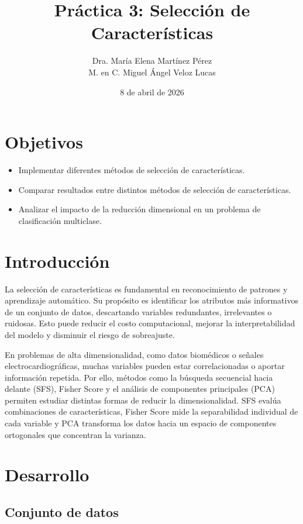 \documentclass{article}
\title{Práctica 3: Selección de Características}
\author{Dra. María Elena Martínez Pérez \\
M. en C. Miguel Ángel Veloz Lucas}
\date{8 de abril de 2026}
\begin{document}
\maketitle

\section{Objetivos}
\begin{itemize}
    \item Implementar diferentes métodos de selección de características.
    \item Comparar resultados entre distintos métodos de selección de características.
    \item Analizar el impacto de la reducción dimensional en un problema de clasificación multiclase.
\end{itemize}

\section{Introducción}

La selección de características es fundamental en reconocimiento de patrones y aprendizaje automático. Su propósito es identificar los atributos más informativos de un conjunto de datos, descartando variables redundantes, irrelevantes o ruidosas. Esto puede reducir el costo computacional, mejorar la interpretabilidad del modelo y disminuir el riesgo de sobreajuste.

En problemas de alta dimensionalidad, como datos biomédicos o señales electrocardiográficas, muchas variables pueden estar correlacionadas o aportar información repetida. Por ello, métodos como la búsqueda secuencial hacia delante (SFS), Fisher Score y el análisis de componentes principales (PCA) permiten estudiar distintas formas de reducir la dimensionalidad. SFS evalúa combinaciones de características, Fisher Score mide la separabilidad individual de cada variable y PCA transforma los datos hacia un espacio de componentes ortogonales que concentran la varianza.

\section{Desarrollo}

\subsection{Conjunto de datos}
\end{document}
